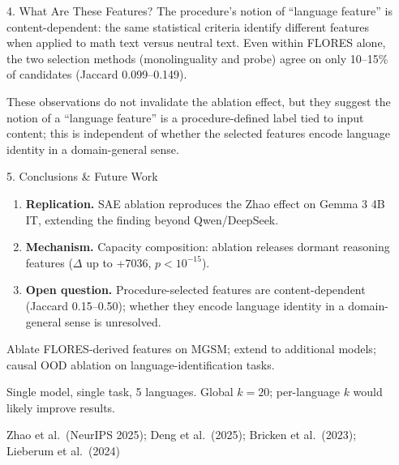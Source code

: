 \documentclass[final,20pt]{beamer}
\newlength{\sepwidth}
\newlength{\colwidth}
\newcommand{\separatorcolumn}{\begin{column}{\sepwidth}\end{column}}
\begin{document}
\begin{frame}[t]
\begin{columns}[t]
\begin{column}{\colwidth}
\begin{block}{4. What Are These Features?}
    The procedure's notion of ``language feature'' is content-dependent:
    the same statistical criteria identify different features when applied
    to math text versus neutral text.
    Even within FLORES alone, the two selection methods (monolinguality and
    probe) agree on only 10--15\% of candidates (Jaccard 0.099--0.149).

    These observations do not invalidate the ablation effect, 
    but they suggest the notion of a ``language feature'' is a
    procedure-defined label tied to input content; this is independent of whether the selected
    features encode language identity in a domain-general sense.

  \end{block}

  \begin{exampleblock}{5. Conclusions \& Future Work}

    \begin{enumerate}
      \item \textbf{Replication.}
            SAE ablation reproduces the Zhao effect on Gemma 3 4B IT,
            extending the finding beyond Qwen/DeepSeek.

      \item \textbf{Mechanism.}
            Capacity composition: ablation releases dormant reasoning
            features ($\Delta$ up to +7036, $p < 10^{-15}$).

      \item \textbf{Open question.}
            Procedure-selected features are content-dependent
            (Jaccard 0.15--0.50); whether they encode language identity
            in a domain-general sense is unresolved.
    \end{enumerate}

    Ablate FLORES-derived features on MGSM; extend to additional models;
    causal OOD ablation on language-identification tasks.

    {\small
    Single model, single task, 5 languages.
    Global $k{=}20$; per-language $k$ would likely improve results.
    }

    {\small
    Zhao et al.\ (NeurIPS 2025);
    Deng et al.\ (2025);
    Bricken et al.\ (2023);
    Lieberum et al.\ (2024)
    }

  \end{exampleblock}

\end{column}

\separatorcolumn
\end{columns}
\end{frame}
\end{document}
